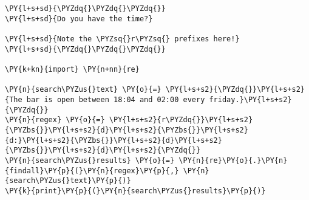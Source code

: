

\section*{}

\begin{Verbatim}[commandchars=\\\{\}]
\PY{l+s+sd}{\PYZdq{}\PYZdq{}\PYZdq{}}
\PY{l+s+sd}{Do you have the time?}

\PY{l+s+sd}{Note the \PYZsq{}r\PYZsq{} prefixes here!}
\PY{l+s+sd}{\PYZdq{}\PYZdq{}\PYZdq{}}

\PY{k+kn}{import} \PY{n+nn}{re}

\PY{n}{search\PYZus{}text} \PY{o}{=} \PY{l+s+s2}{\PYZdq{}}\PY{l+s+s2}{The bar is open between 18:04 and 02:00 every friday.}\PY{l+s+s2}{\PYZdq{}}
\PY{n}{regex} \PY{o}{=} \PY{l+s+s2}{r\PYZdq{}}\PY{l+s+s2}{\PYZbs{}}\PY{l+s+s2}{d}\PY{l+s+s2}{\PYZbs{}}\PY{l+s+s2}{d:}\PY{l+s+s2}{\PYZbs{}}\PY{l+s+s2}{d}\PY{l+s+s2}{\PYZbs{}}\PY{l+s+s2}{d}\PY{l+s+s2}{\PYZdq{}}
\PY{n}{search\PYZus{}results} \PY{o}{=} \PY{n}{re}\PY{o}{.}\PY{n}{findall}\PY{p}{(}\PY{n}{regex}\PY{p}{,} \PY{n}{search\PYZus{}text}\PY{p}{)}
\PY{k}{print}\PY{p}{(}\PY{n}{search\PYZus{}results}\PY{p}{)}
\end{Verbatim}

